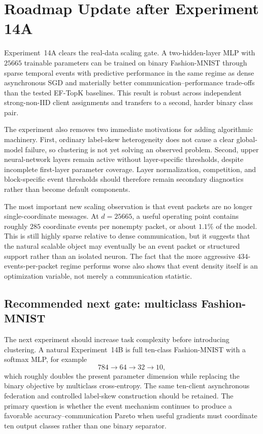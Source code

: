 \section{Roadmap Update after Experiment 14A}
\label{sec:roadmap-post-14a}

Experiment~14A clears the real-data scaling gate. A two-hidden-layer MLP with $25665$ trainable parameters can be trained on binary Fashion-MNIST through sparse temporal events with predictive performance in the same regime as dense asynchronous SGD and materially better communication--performance trade-offs than the tested EF-TopK baselines. This result is robust across independent strong-non-IID client assignments and transfers to a second, harder binary class pair.

The experiment also removes two immediate motivations for adding algorithmic machinery. First, ordinary label-skew heterogeneity does not cause a clear global-model failure, so clustering is not yet solving an observed problem. Second, upper neural-network layers remain active without layer-specific thresholds, despite incomplete first-layer parameter coverage. Layer normalization, competition, and block-specific event thresholds should therefore remain secondary diagnostics rather than become default components.

The most important new scaling observation is that event packets are no longer single-coordinate messages. At $d=25665$, a useful operating point contains roughly $285$ coordinate events per nonempty packet, or about $1.1\%$ of the model. This is still highly sparse relative to dense communication, but it suggests that the natural scalable object may eventually be an event packet or structured support rather than an isolated neuron. The fact that the more aggressive $434$-events-per-packet regime performs worse also shows that event density itself is an optimization variable, not merely a communication statistic.

\subsection{Recommended next gate: multiclass Fashion-MNIST}

The next experiment should increase task complexity before introducing clustering. A natural Experiment~14B is full ten-class Fashion-MNIST with a softmax MLP, for example
\begin{equation}
784\rightarrow64\rightarrow32\rightarrow10,
\end{equation}
which roughly doubles the present parameter dimension while replacing the binary objective by multiclass cross-entropy. The same ten-client asynchronous federation and controlled label-skew construction should be retained. The primary question is whether the event mechanism continues to produce a favorable accuracy--communication Pareto when useful gradients must coordinate ten output classes rather than one binary separator.

